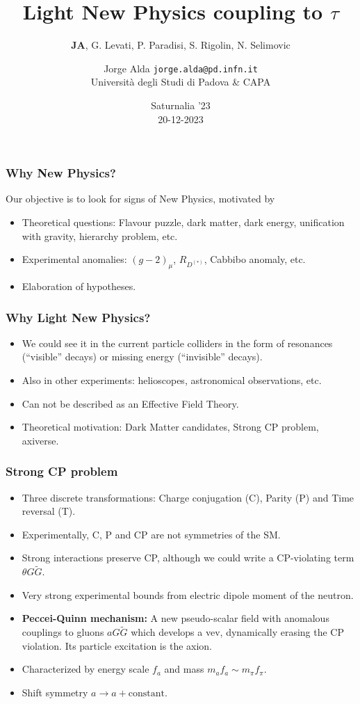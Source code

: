 \documentclass[mathserif, 10pt, aspectratio=169]{beamer}
\title{Light New Physics coupling to $\tau$}
\subtitle{{\bf JA}, G. Levati, P. Paradisi, S. Rigolin, N. Selimovic}
\author[Jorge Alda]{Jorge Alda \hspace{4em} \texttt{jorge.alda@pd.infn.it} \\
Università degli Studi di Padova \& CAPA}
\date[Saturnalia '23]{Saturnalia '23 \\ 20-12-2023}
\begin{document}
\begin{frame}

\titlepage

\end{frame}

\begin{frame}\frametitle{Why New Physics?}
    Our objective is to look for signs of New Physics, motivated by\vspace{20pt}
    \begin{itemize}\setlength{\itemsep}{10pt}
        \item Theoretical questions: Flavour puzzle, dark matter, dark energy, unification with gravity, hierarchy problem, etc.
        \item Experimental anomalies: $(g-2)_\mu$, $R_{D^{(*)}}$, Cabbibo anomaly, etc.
        \item Elaboration of hypotheses.
    \end{itemize}
\end{frame}

\begin{frame}\frametitle{Why Light New Physics?}
    \begin{itemize}\setlength{\itemsep}{10pt}
        \item We could see it in the current particle colliders in the form of resonances (``visible'' decays) or missing energy (``invisible'' decays).
        \item Also in other experiments: helioscopes, astronomical observations, etc.
        \item Can not be described as an Effective Field Theory.
        \item Theoretical motivation: Dark Matter candidates, Strong CP problem, axiverse.
    \end{itemize}
\end{frame}

\begin{frame}\frametitle{Strong CP problem}
    \begin{itemize}\setlength{\itemsep}{10pt}
        \item Three discrete transformations: Charge conjugation (C), Parity (P) and Time reversal (T).
        \item Experimentally, C, P and CP are not symmetries of the SM.
        \item Strong interactions preserve CP, although we could write a CP-violating term $\theta G\tilde{G}$.
        \item Very strong experimental bounds from electric dipole moment of the neutron.
        \item {\bf Peccei-Quinn mechanism:} A new pseudo-scalar field with anomalous couplings to gluons $a G\tilde{G}$ which develops a vev, dynamically erasing the CP violation. Its particle excitation is the axion.
        \item Characterized by energy scale $f_a$ and mass $m_a f_a \sim m_\pi f_\pi$.
        \item Shift symmetry $a \to a + \mathrm{constant}$.
    \end{itemize}
\end{frame}
\end{document}
